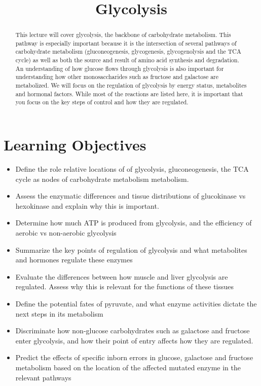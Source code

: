 \documentclass{tufte-handout}
\title{Glycolysis}
\author{}
\date{}  %
\begin{document}
\maketitle%

\begin{abstract}
\noindent This lecture will cover glycolysis, the backbone of carbohydrate metabolism.  This pathway is especially important because it is the intersection of several pathways of carbohydrate metabolism (gluconeogenesis, glycogenesis, glycogenolysis and the TCA cycle) as well as both the source and result of amino acid synthesis and degradation.  An understanding of how glucose flows through glycolysis is also important for understanding how other monosaccharides such as fructose and galactose are metabolized.  We will focus on the regulation of glycolysis by energy status, metabolites and hormonal factors.  While most of the reactions are listed here, it is important that you focus on the key steps of control and how they are regulated.
\end{abstract}

\tableofcontents
\pagebreak
\section{Learning Objectives}

\begin{itemize}
\item Define the role relative locations of of glycolysis, gluconeogenesis, the TCA cycle as nodes of carbohydrate metabolism metabolism.
\item Assess the enzymatic differences and tissue distributions of glucokinase vs hexokinase and explain why this is important.
\item Determine how much ATP is produced from glycolysis, and the efficiency of aerobic vs non-aerobic glycolysis
\item Summarize the key points of regulation of glycolysis and what metabolites and hormones regulate these enzymes
\item Evaluate the differences between how muscle and liver glycolysis are regulated.  Assess why this is relevant for the functions of these tissues
\item Define the potential fates of pyruvate, and what enzyme activities dictate the next steps in its metabolism
\item Discriminate how non-glucose carbohydrates such as galactose and fructose enter glycolysis, and how their point of entry affects how they are regulated.
\item Predict the effects of specific inborn errors in glucose, galactose and fructose metabolism based on the location of the affected mutated enzyme in the relevant pathways



\end{itemize}
\end{document}
